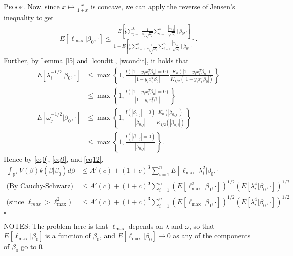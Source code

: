 \documentclass[12pt]{article}
\newcounter{ProofCounter}
\newenvironment{Proof}{\stepcounter{ProofCounter}\textsc{Proof.}}{\hfill$\square$}
\numberwithin{equation}{section}
\begin{document}
\begin{Proof}
  Now, since $x \mapsto \frac{x}{1 + x}$ is concave, we can apply the reverse of Jensen's inequality to get 
  \begin{align}
    E[ \ell_{\max}|\beta_0, \cdot] \leq \frac{ E\left[\frac{1}{\nu} \sum_{j=1}^{k} \frac{1}{\sigma_j \sqrt{\omega_j}} \sum_{i=1}^{n}
    \frac{|x_{i,j}|}{\sqrt{\lambda_i}}\ \big|\ \beta_0, \cdot\right] }{ 1 + E\left[
    \frac{1}{\nu} \sum_{j=1}^{k} \frac{1}{\sigma_j \sqrt{\omega_j}} \sum_{i=1}^{n} \frac{|x_{i,j}|}{\sqrt{\lambda_i}}\ \big|\ \beta_0, \cdot\right] }.
    \label{eq13}
  \end{align}
  Further, by Lemma \ref{l5} and \eqref{lcondit}, \eqref{wcondit}, it holds that
  \begin{align*}
    E[\lambda_i^{-1/2}|\beta_0,\cdot] & \leq \max\left\{ 1, \frac{I(|1-y_ix_i^T\beta_0| = 0)}{|1 - y_ix_i^T\beta_0|} \frac{K_0(|1-y_ix_i^T\beta_0|)}{K_{1/2}(|1-y_ix_i^T\beta_0|)}
    \right\} \\
    & \leq \max\left\{ 1, \frac{I(|1-y_ix_i^T\beta_0| = 0)}{|1 - y_ix_i^T\beta_0|} \right\} \\
    E[\omega_j^{-1/2}|\beta_0,\cdot] & \leq \max\left\{ 1, \frac{I(|\beta_{0,j}| = 0)}{|\beta_{0,j}|} \frac{K_0(|\beta_{0,j}|)}{K_{1/2}(|\beta_{0,j}|)}
    \right\} \\
    & \leq \max\left\{ 1, \frac{I(|\beta_{0,j}| = 0)}{|\beta_{0,j}|} \right\}.
  \end{align*}
  Hence by \eqref{eq0}, \eqref{eq9}, and \eqref{eq12},
  \begin{align}
    \int_{\mathbb{R}^{k}} V(\beta) k(\beta|\beta_0)d\beta & \leq A'(c) + (1 + c)^3 \sum_{i=1}^{n} E[ \ell_{\max}\ \lambda_i^2 | \beta_0,
    \cdot]\nonumber \\
    \text{(By Cauchy-Schwarz) } & \leq A'(c) + (1 + c)^3 \sum_{i=1}^{n} \left(E[\ell_{\max}^2|\beta_0, \cdot]\right)^{1/2} \left(
    E[\lambda_i^4|\beta_0, \cdot] \right)^{1/2} \nonumber \\
    \text{(since $\ell_{max} > \ell_{\max}^2$) } & \leq A'(c) + (1 + c)^3 \sum_{i=1}^{n} \left(E[\ell_{\max}|\beta_0, \cdot]\right)^{1/2} \left(
    E[\lambda_i^4|\beta_0, \cdot] \right)^{1/2} \nonumber \\
  \end{align}
\end{Proof}

NOTES: The problem here is that $\ell_{\max}$ depends on $\lambda$ and $\omega$, so that $E[\ell_{\max}|\beta_0]$ is a function of $\beta_0$, and
$E[\ell_{\max}|\beta_0] \rightarrow 0$ as any of the components of $\beta_0$ go to 0.
\end{document}
